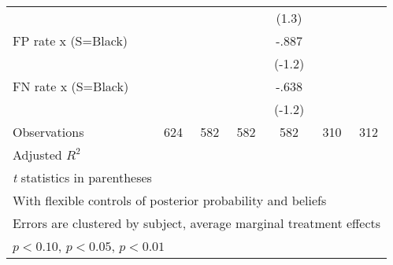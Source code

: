 \begin{table}[htbp]
\begin{tabular}{l*{6}{c}}
                &                  &                  &                  &    (1.3)         &                  &                  \\
FP rate x (S=Black)&                  &                  &                  &    -.887         &                  &                  \\
                &                  &                  &                  &   (-1.2)         &                  &                  \\
FN rate x (S=Black)&                  &                  &                  &    -.638         &                  &                  \\
                &                  &                  &                  &   (-1.2)         &                  &                  \\
\hline
Observations    &      624         &      582         &      582         &      582         &      310         &      312         \\
Adjusted \(R^{2}\)&                  &                  &                  &                  &                  &                  \\
\hline\hline
\multicolumn{7}{l}{\footnotesize \textit{t} statistics in parentheses}\\
\multicolumn{7}{l}{\footnotesize With flexible controls of posterior probability and beliefs}\\
\multicolumn{7}{l}{\footnotesize Errors are clustered by subject, average marginal treatment effects}\\
\multicolumn{7}{l}{\footnotesize \sym{*} \(p<0.10\), \sym{**} \(p<0.05\), \sym{***} \(p<0.01\)}\\
\end{tabular}
\end{table}
